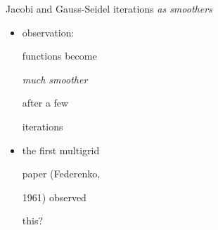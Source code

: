\documentclass[10pt,
               svgnames,
               hyperref={colorlinks,citecolor=DeepPink4,linkcolor=FireBrick,urlcolor=Maroon},
               usepdftitle=false]{beamer}
\begin{document}
\begin{frame}{Jacobi and Gauss-Seidel iterations \emph{as smoothers}}
\begin{itemize}
\item observation:

functions become

\emph{much smoother}

after a few

iterations

\item the first multigrid

paper (Federenko, 

1961) observed

this?
\end{itemize}

\vspace{-40mm}

\end{frame}
\end{document}
